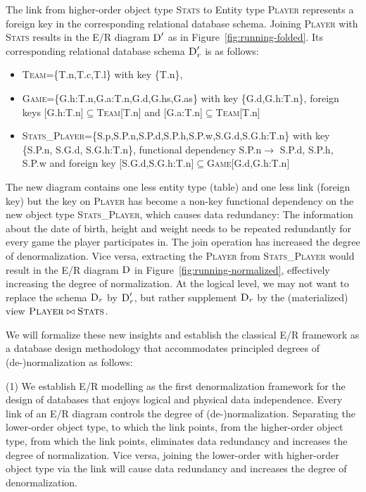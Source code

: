 \documentclass[sigconf]{acmart}
\begin{document}
\begin{example} The link from higher-order object type \textsc{Stats} to Entity type \textsc{Player} represents a foreign key in the corresponding relational database schema. Joining \textsc{Player} with \textsc{Stats} results in the E/R diagram $\textsc{D}'$ as in Figure~\ref{fig:running-folded}. Its corresponding relational database schema $\textsc{D}'_r$ is as follows:
\begin{itemize}\small
\item \textsc{Team}=\{T.n,T.c,T.l\} with key \{T.n\},
\item \textsc{Game}=\{G.h:T.n,G.a:T.n,G.d,G.hs,G.as\} with key \{G.d,G.h:T.n\}, foreign keys {[}G.h:T.n{]}$\subseteq$\textsc{Team}{[}T.n{]} and {[}G.a:T.n{]}$\subseteq$\textsc{Team}{[}T.n{]}
\item \textsc{Stats\_Player}=\{S.p,S.P.n,S.P.d,S.P.h,S.P.w,S.G.d,S.G.h:T.n\} with key \{S.P.n, S.G.d, S.G.h:T.n\}, functional dependency S.P.n$\rightarrow$ S.P.d, S.P.h, S.P.w and foreign key {[}S.G.d,S.G.h:T.n{]}$\subseteq$\textsc{Game}{[}G.d,G.h:T.n{]}
\end{itemize}
The new diagram contains one less entity type (table) and one less link (foreign key) but the key on \textsc{Player} has become a non-key functional dependency on the new object type \textsc{Stats\_Player}, which causes data redundancy: The information about the date of birth, height and weight needs to be repeated redundantly for every game the player participates in. The join operation has increased the degree of denormalization. Vice versa, extracting the \textsc{Player} from \textsc{Stats\_Player} would result in the E/R diagram $\textsc{D}$ in Figure~\ref{fig:running-normalized}, effectively increasing the degree of normalization. At the logical level, we may not want to replace the schema $\textsc{D}_r$ by $\textsc{D}'_r$, but rather supplement $\textsc{D}_r$ by the (materialized) view $\textsc{Player}\bowtie\textsc{Stats}$.
\end{example}

We will formalize these new insights and establish the classical E/R framework as a database design methodology that accommodates principled degrees of (de-)normalization as follows: %

(1) We establish E/R modelling as the first denormalization framework for the design of databases that enjoys logical and physical data independence. Every link of an E/R diagram controls the degree of (de-)normalization. Separating the lower-order object type, to which the link points, from the higher-order object type, from which the link points, eliminates data redundancy and increases the degree of normalization. Vice versa, joining the lower-order with higher-order object type via the link will cause data redundancy and increases the degree of denormalization.
\end{document}
